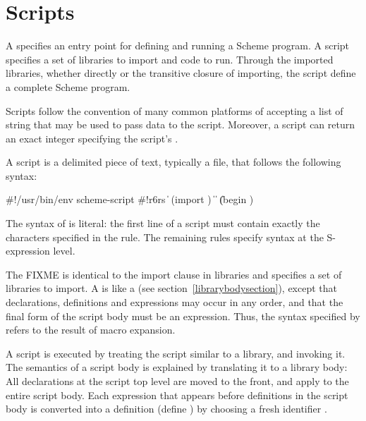 \chapter{Scripts}
\label{scriptchapter}

A  specifies an entry point for defining and running
a Scheme program.  A script specifies a set of libraries to import and
code to run.  Through the imported libraries, whether directly or the
transitive closure of importing, the script define a complete Scheme
program.

Scripts follow the convention of many common platforms of accepting a
list of string  that may be used to
pass data to the script.  Moreover, a script can return an exact
integer specifying the script's .

A script is a delimited piece of text, typically a file, that follows
the following syntax:

\begin{grammar}
 \: \#!/usr/bin/env scheme-script
  \> 
  \> 
 \: \#!r6rs  
  \> \|  
 \: (import )
 \:  
 \: 
\> \| 
\> \| 
\> \| (begin )
\end{grammar}

The syntax of  is literal: the first line of a
script must contain exactly the characters specified in the rule.  The
remaining rules specify syntax at the S-expression level.  

The  FIXME is identical to the import clause in
libraries and specifies a set of libraries to import.  A  is like a  (see
section~\ref{librarybodysection}), except that declarations,
definitions and expressions may occur in any order, and that the final
form of the script body must be an expression.  Thus, the syntax
specified by  refers to the result of macro
expansion.

A script is executed by treating the script similar to a library, and
invoking it.  The semantics of a script body is explained by
translating it to a library body: All declarations at the script top
level are moved to the front, and apply to the entire script body.
Each expression  that appears before definitions in
the script body is converted into a definition {\cf (define 
  )} by choosing a fresh identifier .


